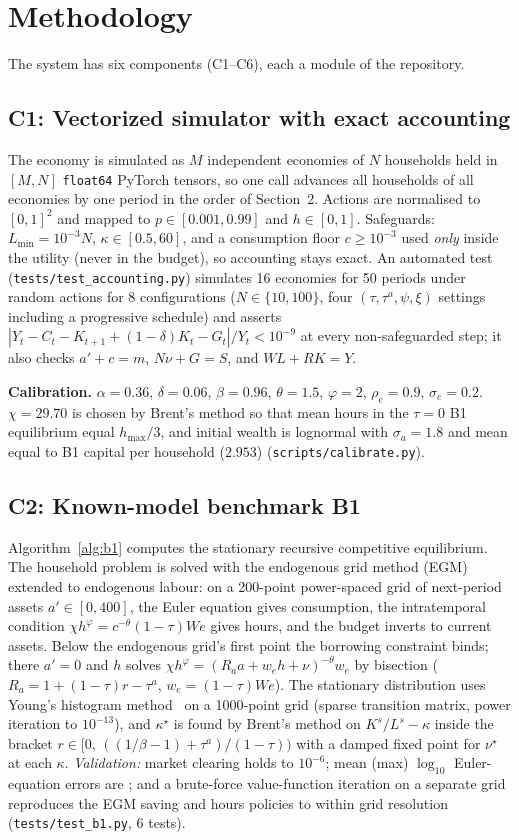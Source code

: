 \section{Methodology}\label{sec:method}
The system has six components (C1--C6), each a module of the repository.

\subsection{C1: Vectorized simulator with exact accounting}
The economy is simulated as $M$ independent economies of $N$ households held in $[M,N]$ \texttt{float64} PyTorch
tensors, so one call advances all households of all economies by one period in the order of
Section~2. Actions are normalised to $[0,1]^2$ and mapped to $p\in[0.001,0.99]$ and $h\in[0,1]$. Safeguards:
$L_{\min}=10^{-3}N$, $\kappa\in[0.5,60]$, and a consumption floor $c\ge10^{-3}$ used \emph{only} inside the utility
(never in the budget), so accounting stays exact. An automated test (\texttt{tests/test\_accounting.py}) simulates 16
economies for 50 periods under random actions for 8 configurations ($N\in\{10,100\}$, four
$(\tau,\tau^a,\psi,\xi)$ settings including a progressive schedule) and asserts
$|Y_t-C_t-K_{t+1}+(1-\delta)K_t-G_t|/Y_t<10^{-9}$ at every non-safeguarded step; it also checks
$a'+c=m$, $N\nu+G=S$, and $WL+RK=Y$.

\textbf{Calibration.} $\alpha=0.36$, $\delta=0.06$, $\beta=0.96$, $\theta=1.5$, $\varphi=2$, $\rho_e=0.9$,
$\sigma_e=0.2$. $\chi=29.70$ is chosen by Brent's method so that mean hours in the $\tau=0$ B1 equilibrium equal
$h_{\max}/3$, and initial wealth is lognormal with $\sigma_a=1.8$ and mean equal to B1 capital per household
($2.953$) (\texttt{scripts/calibrate.py}).

\subsection{C2: Known-model benchmark B1}
Algorithm~\ref{alg:b1} computes the stationary recursive competitive equilibrium. The household problem is solved
with the endogenous grid method (EGM)~\cite{egm} extended to endogenous labour: on a 200-point power-spaced grid
of next-period assets $a'\in[0,400]$, the Euler equation gives consumption, the intratemporal condition
$\chi h^{\varphi}=c^{-\theta}(1-\tau)We$ gives hours, and the budget inverts to current assets. Below the
endogenous grid's first point the borrowing constraint binds; there $a'=0$ and $h$ solves
$\chi h^\varphi=(R_aa+w_eh+\nu)^{-\theta}w_e$ by bisection ($R_a=1+(1-\tau)r-\tau^a$, $w_e=(1-\tau)We$). The
stationary distribution uses Young's histogram method~\cite{young} on a 1000-point grid (sparse transition matrix,
power iteration to $10^{-13}$), and $\kappa^\star$ is found by Brent's method on $K^s/L^s-\kappa$ inside the bracket
$r\in[0,\,((1/\beta-1)+\tau^a)/(1-\tau))$ with a damped fixed point for $\nu^\star$ at each $\kappa$.
\emph{Validation:} market clearing holds to $10^{-6}$; mean (max) $\log_{10}$ Euler-equation errors are
; and a brute-force value-function iteration on a separate grid reproduces the EGM saving and
hours policies to within grid resolution (\texttt{tests/test\_b1.py}, 6 tests).

